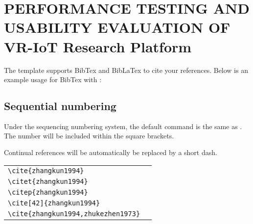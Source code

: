 
\chapter{PERFORMANCE TESTING AND USABILITY EVALUATION OF VR-IoT Research Platform}

The template supports BibTex and BibLaTex to cite your references. Below is an example usage for BibTex with :


\section{Sequential numbering}

Under the sequencing numbering system, the default  command is the same as . The number will be included within the square brackets.

Continual references will be automatically be replaced by a short dash.

\begin{tabular}{l@{\quad$\Rightarrow$\quad}l}
  \verb|\cite{zhangkun1994}|               & \cite{zhangkun1994}               \\
  \verb|\citet{zhangkun1994}|              & \citet{zhangkun1994}              \\
  \verb|\citep{zhangkun1994}|              & \citep{zhangkun1994}              \\
  \verb|\cite[42]{zhangkun1994}|           & \cite[42]{zhangkun1994}           \\
  \verb|\cite{zhangkun1994,zhukezhen1973}| & \cite{zhangkun1994,zhukezhen1973} \\
\end{tabular}





